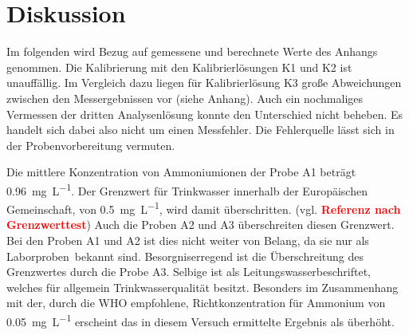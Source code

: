 \newpage
\section{Diskussion}
\label{sec:diskussion}
Im folgenden wird Bezug auf gemessene und berechnete Werte des Anhangs genommen.
Die Kalibrierung mit den Kalibrierlösungen K1 und K2 ist unauffällig. Im Vergleich dazu liegen für Kalibrierlösung K3 große Abweichungen zwischen den Messergebnissen vor (siehe Anhang). Auch ein nochmaliges Vermessen der dritten Analysenlösung konnte den Unterschied nicht beheben. Es handelt sich dabei also nicht um einen Messfehler. Die Fehlerquelle lässt sich in der Probenvorbereitung vermuten.

Die mittlere Konzentration von Ammoniumionen der Probe A1 beträgt \SI{0,96}{\milli\gram\per\liter}. Der Grenzwert für Trinkwasser innerhalb der Europäischen Gemeinschaft, von \SI{0,5}{\milli\gram\per\liter}, wird damit überschritten. (vgl. \textbf{\textcolor{red}{Referenz nach Grenzwerttest}}) Auch die Proben A2 und A3 überschreiten diesen Grenzwert. Bei den Proben A1 und A2 ist dies nicht weiter von Belang, da sie nur als \glqq Laborproben\grqq\, bekannt sind. Besorgniserregend ist die Überschreitung des Grenzwertes durch die Probe A3. Selbige ist als \glqq Leitungswasser\grqq beschriftet, welches für allgemein Trinkwasserqualität besitzt. Besonders im Zusammenhang mit der, durch die WHO empfohlene, Richtkonzentration für Ammonium von \SI{0,05}{\milli\gram\per\liter} erscheint das in diesem Versuch ermittelte Ergebnis als überhöht. 


